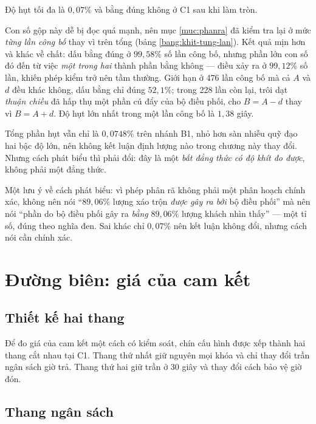 Độ hụt tối đa là $0{,}07\%$ và bằng đúng không ở C1 sau khi làm tròn.

Con số gộp này dễ bị đọc quá mạnh, nên mục \ref{muc:phanra} đã kiểm tra lại ở mức \emph{từng lần
công bố} thay vì trên tổng (bảng \ref{bang:khit-tung-lan}). Kết quả mịn hơn và khác về chất: dấu
bằng đúng ở $99{,}58\%$ số lần công bố, nhưng phần lớn con số đó đến từ việc \emph{một trong hai}
thành phần bằng không --- điều xảy ra ở $99{,}12\%$ số lần, khiến phép kiểm trở nên tầm thường.
Giới hạn ở 476 lần công bố mà cả $A$ và $d$ đều khác không, dấu bằng chỉ đúng $52{,}1\%$; trong
228 lần còn lại, trôi dạt \emph{thuận chiều} đã hấp thụ một phần cú đẩy của bộ điều phối, cho
$B = A - d$ thay vì $B = A + d$. Độ hụt lớn nhất trong một lần công bố là $1{,}38$ giây.

Tổng phần hụt vẫn chỉ là $0{,}0748\%$ trên nhánh B1, nhỏ hơn sàn nhiễu quỹ đạo hai bậc độ lớn,
nên không kết luận định lượng nào trong chương này thay đổi. Nhưng cách phát biểu thì phải đổi:
đây là một \emph{bất đẳng thức có độ khít đo được}, không phải một đẳng thức.

Một lưu ý về cách phát biểu: vì phép phân rã không phải một phân hoạch chính xác, không nên nói
``$89{,}06\%$ lượng xáo trộn \emph{được gây ra bởi} bộ điều phối'' mà nên nói ``phần do bộ điều
phối gây ra \emph{bằng} $89{,}06\%$ lượng khách nhìn thấy'' --- một tỉ số, đúng theo nghĩa đen.
Sai khác chỉ $0{,}07\%$ nên kết luận không đổi, nhưng cách nói cần chính xác.

\section{Đường biên: giá của cam kết}
\label{muc:duongbien}

\subsection{Thiết kế hai thang}

Để đo giá của cam kết một cách có kiểm soát, chín cấu hình được xếp thành hai thang cắt nhau
tại C1. Thang thứ nhất giữ nguyên mọi khóa và chỉ thay đổi trần ngân sách giờ trả. Thang thứ
hai giữ trần ở 30 giây và thay đổi cách bảo vệ giờ đón.

\subsection{Thang ngân sách}

